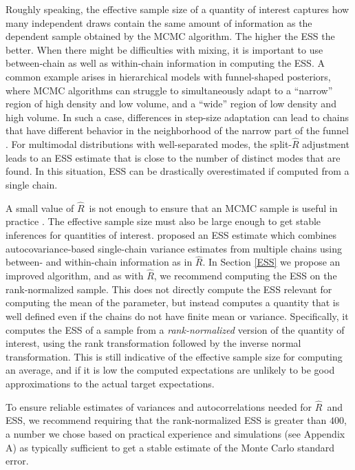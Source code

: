 \documentclass[american,]{article}
\newcommand{\Rhat}{$\widehat{R}$}
\theoremstyle{definition}
\begin{document}
Roughly speaking, the effective sample size of a quantity of interest captures how many
independent draws contain the same amount of information as the dependent 
sample obtained by the MCMC algorithm. The higher the ESS the better.
When there might be difficulties with mixing, it is important to use between-chain as well as within-chain
information in computing the ESS. A common example arises in hierarchical models with funnel-shaped posteriors, where MCMC algorithms can struggle to simultaneously adapt to a ``narrow'' region of 
high density and low volume, and a ``wide'' region of low density and high volume. In such a case, differences in step-size adaptation can
lead to chains that have different behavior in the neighborhood of the narrow part
of the funnel \citep{Betancourt+Girolami:2019}.  For multimodal
distributions with well-separated modes, the split-\(\widehat{R}\)
adjustment leads to an ESS estimate that is close to the number of
distinct modes that are found. 
In this situation, ESS can be drastically overestimated if computed from a single chain.

A small value of \Rhat\ is not enough to ensure 
that an MCMC sample is useful in practice \citep{vats2018revisiting}.  The effective sample size must also be large enough to get
stable inferences for quantities of interest. \citet{BDA3} proposed an ESS estimate which combines autocovariance-based single-chain variance estimates \citep{Hastings:1970,Geyer:1992} from multiple chains using between- and within-chain information as in \Rhat.
In Section \ref{ESS} we propose an improved algorithm, and
as with \Rhat, we 
recommend computing the ESS on the rank-normalized sample. This does not
directly compute the ESS relevant for computing the mean of the parameter, but 
instead computes a quantity that is well defined even if the chains do not 
have finite mean or variance.  Specifically, it computes the ESS of a sample
from a \emph{rank-normalized} version of the quantity of interest, using the rank transformation followed by the inverse normal transformation. This is still indicative of the effective sample size for computing an average, and if it is low the computed
expectations are unlikely to be good approximations to the actual
target expectations.

To ensure reliable estimates of variances and autocorrelations needed for
\Rhat\ and ESS, we recommend requiring that the rank-normalized ESS is 
greater than $400$, a number we chose based on practical experience and
simulations (see Appendix A) as typically sufficient to get a stable
estimate of the Monte Carlo standard error.
\end{document}
